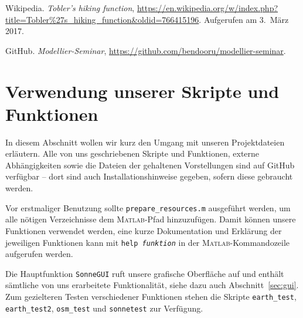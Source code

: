 \documentclass[
    paper=a4,
    DIV14,
    fontsize=12pt,
    pagesize=pdftex,
    toc=bibliographynumbered
]{scrartcl}
\numberwithin{figure}{section}
\numberwithin{equation}{section}
\numberwithin{table}{section}
\begin{document}
\begin{thebibliography}{3}
        Wikipedia.
        \emph{Tobler's hiking function},
        \url{https://en.wikipedia.org/w/index.php?title=Tobler%27s_hiking_function&oldid=766415196}.
        Aufgerufen am 3.\ März 2017.

        GitHub. \emph{Modellier-Seminar},
        \url{https://github.com/bendooru/modellier-seminar}.
\end{thebibliography}

\appendix
\section{Verwendung unserer Skripte und Funktionen}
In diesem Abschnitt wollen wir kurz den Umgang mit unseren Projektdateien erläutern.
Alle von uns geschriebenen Skripte und Funktionen, externe Abhängigkeiten sowie die
Dateien der gehaltenen Vorstellungen sind auf GitHub\cite{git:modsemi} verfügbar -- dort
sind auch Installationshinweise gegeben, sofern diese gebraucht werden.

Vor erstmaliger Benutzung sollte \verb|prepare_resources.m| ausgeführt werden, um alle
nötigen Verzeichnisse dem \textsc{Matlab}-Pfad hinzuzufügen. Damit können unsere
Funktionen verwendet werden, eine kurze Dokumentation und Erklärung der jeweiligen
Funktionen kann mit \texttt{help \textit{funktion}} in der \textsc{Matlab}-Kommandozeile
aufgerufen werden.

Die Hauptfunktion \texttt{SonneGUI} ruft unsere grafische Oberfläche auf und enthält
sämtliche von uns erarbeitete Funktionalität, siehe dazu auch Abschnitt~\ref{sec:gui}. Zum
gezielteren Testen verschiedener Funktionen stehen die Skripte \verb|earth_test|,
\verb|earth_test2|, \verb|osm_test| und \verb|sonnetest| zur Verfügung.
\end{document}
